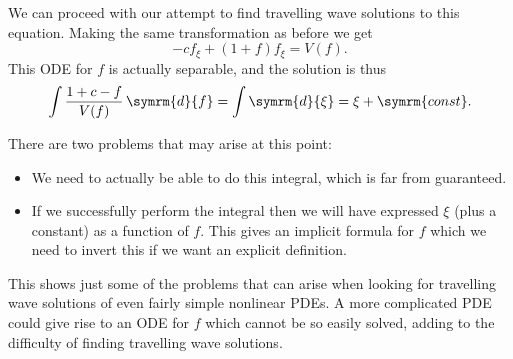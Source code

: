 \documentclass[fleqn]{NotesClass}
\renewcommand{\dl}{\symrm{d}}
\renewcommand{\dd}{\,\symrm{d}}
\newcommand{\const}{\symrm{const}}
\begin{document}
    We can proceed with our attempt to find travelling wave solutions to this equation.
    Making the same transformation as before we get
    \begin{equation}
        -cf_\xi + (1 + f)f_\xi = V(f).
    \end{equation}
    This ODE for \(f\) is actually separable, and the solution is thus
    \begin{equation}
        \int \frac{1 + c - f}{V(f)} \dd{f} = \int \dl{\xi} = \xi + \const.
    \end{equation}
    
    There are two problems that may arise at this point:
    \begin{itemize}
        \item We need to actually be able to do this integral, which is far from guaranteed.
        \item If we successfully perform the integral then we will have expressed \(\xi\) (plus a constant) as a function of \(f\).
        This gives an implicit formula for \(f\) which we need to invert this if we want an explicit definition.
    \end{itemize}
    This shows just some of the problems that can arise when looking for travelling wave solutions of even fairly simple nonlinear PDEs.
    A more complicated PDE could give rise to an ODE for \(f\) which cannot be so easily solved, adding to the difficulty of finding travelling wave solutions.
    
    
    
    \backmatter
    \renewcommand{\glossaryname}{Acronyms}
    \printglossary[acronym]
    \printindex
\end{document}
